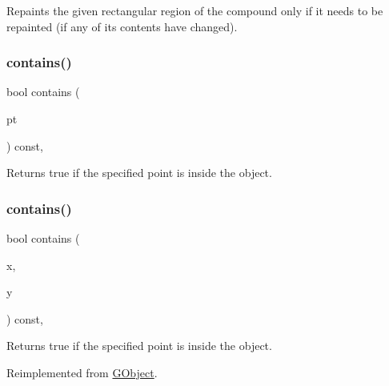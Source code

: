 Repaints the given rectangular region of the compound only if it needs to be repainted (if any of its contents have changed). 

\mbox{\label{classsgl_1_1GObject_a1dbc9dafaae51958112dbe1267a1f547}} 
\subsubsection{\texorpdfstring{contains()}{contains()}\hspace{0.1cm}{\footnotesize\ttfamily [1/2]}}
{\footnotesize\ttfamily bool contains (\begin{DoxyParamCaption}\item[{const \mbox{\hyperlink{structsgl_1_1GPoint}{G\+Point}} \&}]{pt }\end{DoxyParamCaption}) const\hspace{0.3cm}{\ttfamily [virtual]}, {\ttfamily [inherited]}}



Returns {\ttfamily true} if the specified point is inside the object. 

\mbox{\label{classsgl_1_1GCompound_ad973a1d55799d3a73bf8b04986cd804e}} 
\subsubsection{\texorpdfstring{contains()}{contains()}\hspace{0.1cm}{\footnotesize\ttfamily [2/2]}}
{\footnotesize\ttfamily bool contains (\begin{DoxyParamCaption}\item[{double}]{x,  }\item[{double}]{y }\end{DoxyParamCaption}) const\hspace{0.3cm}{\ttfamily [override]}, {\ttfamily [virtual]}}



Returns {\ttfamily true} if the specified point is inside the object. 



Reimplemented from \mbox{\hyperlink{classsgl_1_1GObject_abb6a5d7c03e6eaaae97264c4799ce7c3}{G\+Object}}.

